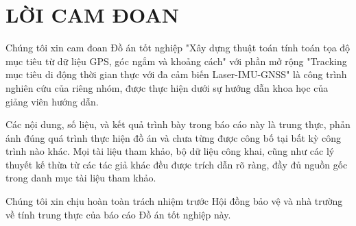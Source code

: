\section*{LỜI CAM ĐOAN}

\hspace{0.5cm} Chúng tôi xin cam đoan Đồ án tốt nghiệp "Xây dựng thuật toán tính toán tọa độ mục tiêu từ dữ liệu GPS, góc ngắm và khoảng cách" với phần mở rộng "Tracking mục tiêu di động thời gian thực với đa cảm biến Laser-IMU-GNSS" là công trình nghiên cứu của riêng nhóm, được thực hiện dưới sự hướng dẫn khoa học của giảng viên hướng dẫn.

Các nội dung, số liệu, và kết quả trình bày trong báo cáo này là trung thực, phản ánh đúng quá trình thực hiện đồ án và chưa từng được công bố tại bất kỳ công trình nào khác. Mọi tài liệu tham khảo, bộ dữ liệu công khai, cũng như các lý thuyết kế thừa từ các tác giả khác đều được trích dẫn rõ ràng, đầy đủ nguồn gốc trong danh mục tài liệu tham khảo.

Chúng tôi xin chịu hoàn toàn trách nhiệm trước Hội đồng bảo vệ và nhà trường về tính trung thực của báo cáo Đồ án tốt nghiệp này.
